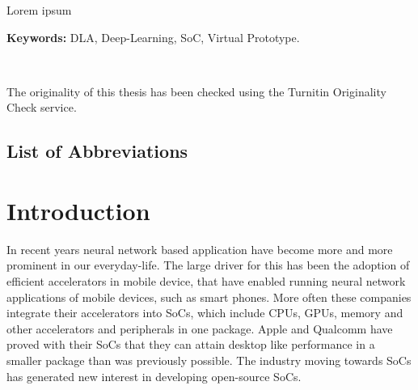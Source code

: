 \documentclass[12pt,a4paper,english
]{tunithesis}
\begin{document}
\vspace{0.5cm}


\noindent Lorem ipsum~

\noindent\textbf{Keywords:} DLA, Deep-Learning, SoC, Virtual Prototype.

~

\noindent The originality of this thesis has been checked using the Turnitin Originality Check service.


\clearpage

\section*{List of Abbreviations}
\begin{acronym}
\end{acronym}



\setcounter{tocdepth}{3}              %
\tableofcontents                      %

\if@twoside
\cleardoublepage
\fi


\renewcommand{\chaptername}{} %


\chapter{Introduction}
\label{ch:introduction}
\setcounter{page}{1} %

In recent years neural network based application have become more and more prominent in our everyday-life. The large driver for this has been the adoption of efficient accelerators in mobile device, that have enabled running neural network applications of mobile devices, such as smart phones. More often these companies integrate their accelerators into SoCs, which include CPUs, GPUs, memory and other accelerators and peripherals in one package. Apple and Qualcomm have proved with their SoCs that they can attain desktop like performance in a smaller package than was previously possible. The industry moving towards SoCs has generated new interest in developing open-source SoCs.
\end{document}

